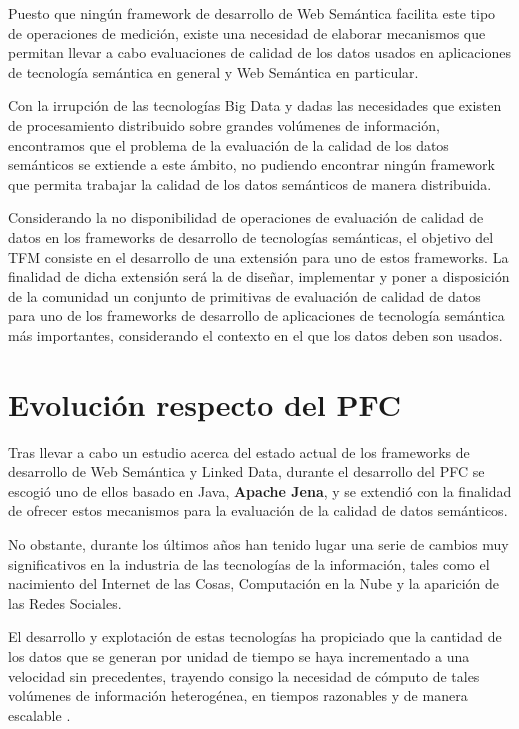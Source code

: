 Puesto que ningún framework de desarrollo de Web Semántica facilita este tipo de
operaciones de medición, existe una necesidad de elaborar
mecanismos que permitan llevar a cabo evaluaciones de calidad de los datos
usados en aplicaciones de tecnología semántica en general y Web Semántica en
particular.

Con la irrupción de las tecnologías Big Data y dadas las necesidades que existen
de procesamiento distribuido sobre grandes volúmenes de información, encontramos
que el problema de la evaluación de la calidad de los datos semánticos se
extiende a este ámbito, no pudiendo encontrar ningún framework que permita
trabajar la calidad de los datos semánticos de manera distribuida. 

Considerando la no disponibilidad de operaciones de evaluación de calidad de datos en los
frameworks de desarrollo de tecnologías semánticas, el objetivo del \acf{TFM}
consiste en el desarrollo de una
extensión para uno de estos frameworks. La finalidad de
dicha extensión será la de diseñar, implementar y poner a disposición de la
comunidad un conjunto de primitivas de evaluación de calidad de datos para uno de
los frameworks de desarrollo de aplicaciones de tecnología semántica más
importantes, considerando el contexto en el que los
datos deben son usados. 


\section{Evolución respecto del PFC}


Tras llevar a cabo un estudio acerca del estado actual de los frameworks de
desarrollo de Web Semántica y Linked Data, durante el desarrollo del \acf{PFC}
se escogió uno de ellos basado en
Java, \textbf{Apache Jena}, y se extendió con la finalidad de ofrecer estos
mecanismos para la evaluación de la calidad de datos semánticos.

No obstante, durante los últimos años han tenido lugar una serie de cambios muy
significativos
en la industria de las tecnologías de la información, tales como el nacimiento
del Internet
de las Cosas, Computación en la Nube y la aparición de las Redes Sociales.

El desarrollo y explotación de estas tecnologías ha propiciado que la cantidad
de los datos
que se generan por unidad de tiempo se haya incrementado a una velocidad sin
precedentes,
trayendo consigo la necesidad de cómputo de tales volúmenes de información
heterogénea,
en tiempos razonables y de manera escalable \cite{map_reduce}.

